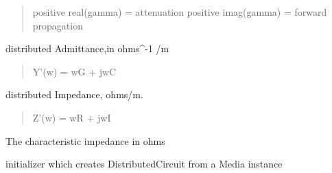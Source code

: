 \documentclass[letterpaper,10pt,english]{sphinxmanual}
\begin{document}
\begin{fulllineitems}
\begin{quote}
positive real(gamma) = attenuation
positive imag(gamma) = forward propagation
\end{quote}

\begin{fulllineitems}
\label{api/mwavepy.media:mwavepy.media.distributedCircuit.DistributedCircuit.Y}
distributed Admittance,in ohms\textasciicircum{}-1 /m
\begin{quote}

Y'(w) = wG + jwC
\end{quote}

\end{fulllineitems}


\begin{fulllineitems}
\label{api/mwavepy.media:mwavepy.media.distributedCircuit.DistributedCircuit.Z}
distributed Impedance, ohms/m.
\begin{quote}

Z'(w) = wR + jwI
\end{quote}

\end{fulllineitems}


\begin{fulllineitems}
\label{api/mwavepy.media:mwavepy.media.distributedCircuit.DistributedCircuit.Z0}
The characteristic impedance in ohms

\end{fulllineitems}


\begin{fulllineitems}
\label{api/mwavepy.media:mwavepy.media.distributedCircuit.DistributedCircuit.from_Media}
initializer which creates  DistributedCircuit from a Media 
instance

\end{fulllineitems}



\end{fulllineitems}
\end{document}
